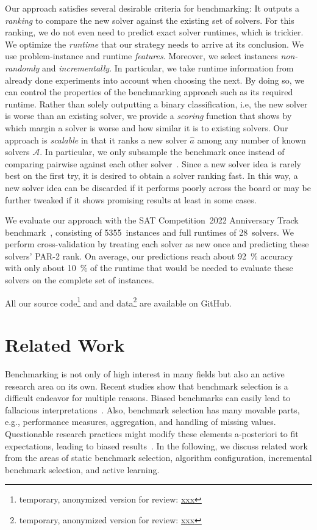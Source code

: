 \documentclass[runningheads]{llncs}
\begin{document}
Our approach satisfies several desirable criteria for benchmarking:
It outputs a \emph{ranking} to compare the new solver against the existing set of solvers.
For this ranking, we do not even need to predict exact solver runtimes, which is trickier.
We optimize the \emph{runtime} that our strategy needs to arrive at its conclusion.
We use problem-instance and runtime \emph{features}.
Moreover, we select instances \emph{non-randomly} and \emph{incrementally}.
In particular, we take runtime information from already done experiments into account when choosing the next.
By doing so, we can control the properties of the benchmarking approach such as its required runtime.
Rather than solely outputting a binary classification, i.e, the new solver is worse than an existing solver, we provide a \emph{scoring} function that shows by which margin a solver is worse and how similar it is to existing solvers.
Our approach is \emph{scalable} in that it ranks a new solver $\hat{a}$ among any number of known solvers $\mathcal{A}$.
In particular, we only subsample the benchmark once instead of comparing pairwise against each other solver~\cite{MatriconAFSH21}.
Since a new solver idea is rarely best on the first try, it is desired to obtain a solver ranking fast.
In this way, a new solver idea can be discarded if it performs poorly across the board or may be further tweaked if it shows promising results at least in some cases.

We evaluate our approach with the SAT Competition~2022 Anniversary Track benchmark~\cite{sat2022}, consisting of 5355~instances and full runtimes of 28~solvers.
We perform cross-validation by treating each solver as new once and predicting these solvers' PAR-2 rank.
On average, our predictions reach about \SI{92}{\%} accuracy with only about \SI{10}{\%} of the runtime that would be needed to evaluate these solvers on the complete set of instances.

All our source code\footnote{temporary, anonymized version for review: \url{xxx}} and and data\footnote{temporary, anonymized version for review: \url{xxx}} are available on GitHub.


\section{Related Work}

Benchmarking is not only of high interest in many fields but also an active research area on its own.
Recent studies show that benchmark selection is a difficult endeavor for multiple reasons.
Biased benchmarks can easily lead to fallacious interpretations~\cite{abs-2107-07002}.
Also, benchmark selection has many movable parts, e.g., performance measures, aggregation, and handling of missing values.
Questionable research practices might modify these elements a-posteriori to fit expectations, leading to biased results~\cite{NiesslHWCB22}.
In the following, we discuss related work from the areas of static benchmark selection, algorithm configuration, incremental benchmark selection, and active learning.
\end{document}
